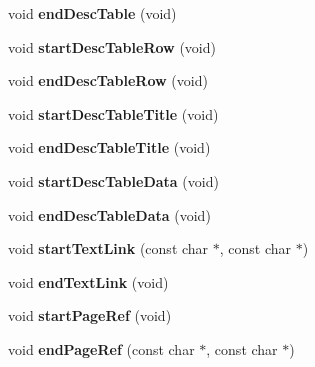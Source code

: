 \begin{DoxyCompactItemize}
void {\bfseries end\+Desc\+Table} (void)
\item 
\mbox{\label{class_docbook_generator_a1c8a3b36b56840ce70d14b1f220a7d04}} 
void {\bfseries start\+Desc\+Table\+Row} (void)
\item 
\mbox{\label{class_docbook_generator_a191efddbd8402fa939a2302027b1331f}} 
void {\bfseries end\+Desc\+Table\+Row} (void)
\item 
\mbox{\label{class_docbook_generator_a9522e58842f09e0062723d5eec483feb}} 
void {\bfseries start\+Desc\+Table\+Title} (void)
\item 
\mbox{\label{class_docbook_generator_abe08e164b411f9fc279fa7db8d29306f}} 
void {\bfseries end\+Desc\+Table\+Title} (void)
\item 
\mbox{\label{class_docbook_generator_a5c5b4fe6f2359335c121e9cf940f2b48}} 
void {\bfseries start\+Desc\+Table\+Data} (void)
\item 
\mbox{\label{class_docbook_generator_ad5da8dc28569ce5ac4a594175a11eecd}} 
void {\bfseries end\+Desc\+Table\+Data} (void)
\item 
\mbox{\label{class_docbook_generator_acee52d6675a67267a096b42afd6a0592}} 
void {\bfseries start\+Text\+Link} (const char $\ast$, const char $\ast$)
\item 
\mbox{\label{class_docbook_generator_abae26f5d00240c52d70a0d9c822563f3}} 
void {\bfseries end\+Text\+Link} (void)
\item 
\mbox{\label{class_docbook_generator_a9eb3cc68a03f56e43d7927348f98498a}} 
void {\bfseries start\+Page\+Ref} (void)
\item 
\mbox{\label{class_docbook_generator_afc5f293acdf0264e6703733b7ef92313}} 
void {\bfseries end\+Page\+Ref} (const char $\ast$, const char $\ast$)
\item 
\mbox{\label{class_docbook_generator_a4d1eeef8da1dd4ba4a2538250a7eff99}} 

\end{DoxyCompactItemize}
